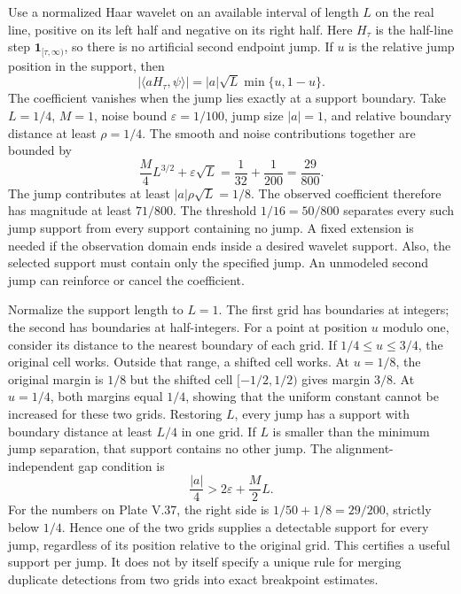 Use a normalized Haar wavelet on an available interval of length $L$ on the real line, positive on its left half and negative on its right half. Here $H_\tau$ is the half-line step $\mathbf1_{[\tau,\infty)}$, so there is no artificial second endpoint jump.
If $u$ is the relative jump position in the support, then
\[
|\langle aH_\tau,\psi\rangle|
=|a|\sqrt L\min\{u,1-u\}.
\]
The coefficient vanishes when the jump lies exactly at a support boundary.
Take $L=1/4$, $M=1$, noise bound $\varepsilon=1/100$, jump size $|a|=1$, and relative boundary distance at least $\rho=1/4$. The smooth and noise contributions together are bounded by
\[
\frac M4L^{3/2}+\varepsilon\sqrt L
=\frac1{32}+\frac1{200}=\frac{29}{800}.
\]
The jump contributes at least $|a|\rho\sqrt L=1/8$. The observed coefficient therefore has magnitude at least $71/800$. The threshold $1/16=50/800$ separates every such jump support from every support containing no jump.
A fixed extension is needed if the observation domain ends inside a desired wavelet support. Also, the selected support must contain only the specified jump. An unmodeled second jump can reinforce or cancel the coefficient.

Normalize the support length to $L=1$. The first grid has boundaries at integers; the second has boundaries at half-integers. For a point at position $u$ modulo one, consider its distance to the nearest boundary of each grid.
If $1/4\le u\le3/4$, the original cell works. Outside that range, a shifted cell works. At $u=1/8$, the original margin is $1/8$ but the shifted cell $[-1/2,1/2)$ gives margin $3/8$. At $u=1/4$, both margins equal $1/4$, showing that the uniform constant cannot be increased for these two grids.
Restoring $L$, every jump has a support with boundary distance at least $L/4$ in one grid. If $L$ is smaller than the minimum jump separation, that support contains no other jump.
The alignment-independent gap condition is
\[
\frac{|a|}{4}>2\varepsilon+\frac M2L.
\]
For the numbers on Plate V.37, the right side is $1/50+1/8=29/200$, strictly below $1/4$. Hence one of the two grids supplies a detectable support for every jump, regardless of its position relative to the original grid.
This certifies a useful support per jump. It does not by itself specify a unique rule for merging duplicate detections from two grids into exact breakpoint estimates.

